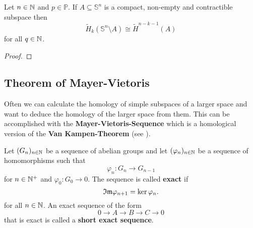 \begin{thm}\label{thm:alex}
  Let $n \in \mathbb{N}$ and $p \in \mathbb{P}$. If $A \subseteq \mathbb{S}^n$ is a compact, non-empty and contractible subspace then
  \begin{equation*}
    \tilde{H}_k(\mathbb{S}^n \setminus A) \cong \tilde{H}^{n-k-1}(A)
  \end{equation*}
  for all $q \in \mathbb{N}$.
\end{thm}

\begin{proof}
  
\end{proof}

\subsection{Theorem of Mayer-Vietoris}
Often we can calculate the homology of simple subspaces of a larger space and want to deduce the homology of the larger space from them.
This can be accomplished with the \textbf{Mayer-Vietoris-Sequence} which is a homological version of the \textbf{Van Kampen-Theorem} (see \cite[Chapter 1.2]{hatcher}).

\begin{defin}
  Let $(G_n)_{n\in\mathbb{N}}$ be a sequence of abelian groups and let $(\varphi_n)_{n\in\mathbb{N}}$ be a sequence of homomorphisms such that
  \begin{equation*}
    \varphi_n\colon G_n \to G_{n-1}
  \end{equation*}
  for $n \in \mathbb{N}^+$ and $\varphi_0\colon G_0 \to 0$.
  The sequence is called \textbf{exact} if
  \begin{equation*}
    \mathfrak{Im}\varphi_{n+1} = \ker\varphi_n.
  \end{equation*}
  for all $n \in \mathbb{N}$.
  An exact sequence of the form
  \begin{equation*}
    0 \to A \to B \to C \to 0
  \end{equation*}
  that is exact is called a \textbf{short exact sequence}.
\end{defin}

